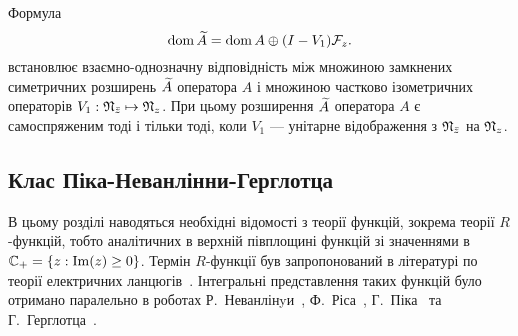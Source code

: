 \begin{theorem} \label{Neumann_2_Theorem}
	Формула
	\begin{equation}
 		\operatorname{dom}{\widetilde A} = \operatorname{dom}{A} \oplus (I - V_1)\mathcal{F}_z.
	\end{equation}
	встановлює взаємно-однозначну відповідність між множиною замкнених симетричних розширень $\widetilde A$ оператора $A$ і множиною частково ізометричних операторів $V_1: \mathfrak{N}_{\bar z} \mapsto \mathfrak{N}_z$.
	При цьому розширення $\widetilde A$ оператора $A$ є самоспряженим тоді і тільки тоді, коли $V_1$ --- унітарне відображення з $\mathfrak{N}_{\bar z}$ на $\mathfrak{N}_z$.
\end{theorem}




\subsection{Клас Піка-Неванлінни-Герглотца} %

В цьому розділі наводяться необхідні відомості з теорії функцій, зокрема теорії $R$-функцій, тобто аналітичних в верхній півплощині функцій зі значеннями в $\mathbb{C}_+=\{z: \operatorname{Im}(z)\ge 0\}$.
Термін $R$-функції був запропонований в літературі по теорії електричних ланцюгів~\cite{LaneTom1958}. Інтегральні представлення таких функцій було отримано паралельно в роботах Р.~Неванлінyи~\cite{Nev1919}, Ф.~Ріса~\cite{Riesz1913}, Г.~Піка~\cite{Pick1916} та Г.~Герглотца~\cite{Her1911}.

